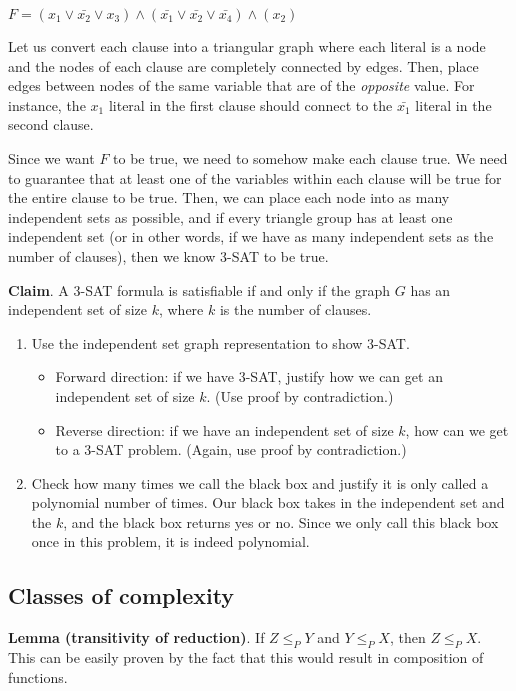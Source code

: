 \documentclass{article}
\begin{document}
$F = (x_1 \vee \bar{x_2} \vee x_3) \wedge (\bar{x_1} \vee \bar{x_2} \vee \bar{x_4}) \wedge (x_2)$

Let us convert each clause into a triangular graph where each literal is a node and the nodes of each clause are completely connected by edges. Then, place edges between nodes of the same variable that are of the \textit{opposite} value. For instance, the $x_1$ literal in the first clause should connect to the $\bar{x_1}$ literal in the second clause.

Since we want $F$ to be true, we need to somehow make each clause true. We need to guarantee that at least one of the variables within each clause will be true for the entire clause to be true. Then, we can place each node into as many independent sets as possible, and if every triangle group has at least one independent set (or in other words, if we have as many independent sets as the number of clauses), then we know 3-SAT to be true.

\textbf{Claim}. A 3-SAT formula is satisfiable if and only if the graph $G$ has an independent set of size $k$, where $k$ is the number of clauses.

\begin{enumerate}
    \item Use the independent set graph representation to show 3-SAT.
    \begin{itemize}
        \item Forward direction: if we have 3-SAT, justify how we can get an independent set of size $k$. (Use proof by contradiction.)
        \item Reverse direction: if we have an independent set of size $k$, how can we get to a 3-SAT problem. (Again, use proof by contradiction.)
    \end{itemize}
    \item Check how many times we call the black box and justify it is only called a polynomial number of times. Our black box takes in the independent set and the $k$, and the black box returns yes or no. Since we only call this black box once in this problem, it is indeed polynomial.
\end{enumerate}

\subsection{Classes of complexity}
\textbf{Lemma (transitivity of reduction)}. If $Z \leq_{P} Y$ and $Y \leq_{P} X$, then $Z \leq_{P} X$. This can be easily proven by the fact that this would result in composition of functions.
\end{document}
